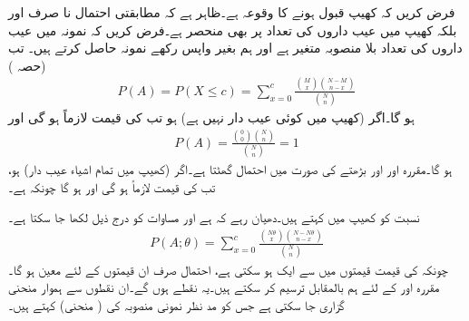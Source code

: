 فرض کریں کہ کھیپ قبول ہونے کا وقوعہ  ہے۔ظاہر ہے کہ مطابقتی احتمال  نا صرف  اور  بلکہ کھیپ میں عیب داروں کی تعداد  پر بھی منحصر ہے۔فرض کریں کہ نمونہ میں عیب داروں کی تعداد بلا منصوبہ متغیر  ہے اور ہم بغیر واپس رکھے  نمونہ حاصل کرتے ہیں۔ تب (حصہ )
\begin{align}\label{مساوات_شماریات_نسبت_عیب_دار_الف}
P(A)=P(X\le c)=\sum_{x=0}^{c}\frac{\binom{M}{x}\binom{N-M}{n-x}}{\binom{N}{n}}
\end{align}
ہو گا۔اگر  (کھیپ میں کوئی عیب دار نہیں ہے) ہو تب  کی قیمت لازماً  ہو گی اور
\begin{align*}
P(A)=\frac{\binom{0}{0}\binom{N}{n}}{\binom{N}{n}}=1
\end{align*}
ہو گا۔مقررہ  اور  اور بڑھتے  کی صورت میں احتمال  گھٹتا ہے۔اگر  (کھیپ میں تمام اشیاء عیب دار) ہو، تب  کی قیمت لازماً  ہو گی اور  ہو گا چونکہ  ہے۔

نسبت  کو کھیپ میں  کہتے ہیں۔دھیان رہے کہ  ہے اور مساوات  کو درج ذیل لکھا جا سکتا ہے۔
\begin{align}\label{مساوات_شماریات_نسبت_عیب_دار_ب}
P(A;\theta)=\sum_{x=0}^{c}\frac{\binom{N\theta}{x}\binom{N-N\theta}{n-x}}{\binom{N}{n}}
\end{align}
چونکہ  کی قیمت  قیمتوں  میں سے ایک ہو سکتی ہے، احتمال   صرف ان قیمتوں  کے لئے  معین ہو گا۔مقررہ  اور  کے لئے ہم  بالمقابل  ترسیم کر سکتے ہیں۔یہ  نقطے ہوں گے۔ان نقطوں سے ہموار منحنی گزاری جا سکتی ہے جس کو مد نظر نمونی منصوبہ کی  ( منحنی)  کہتے ہیں۔

